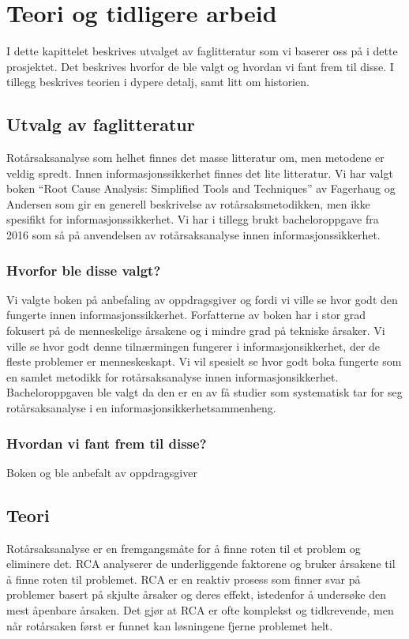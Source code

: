 \chapter{Teori og tidligere arbeid}
\label{kap:teori}
I dette kapittelet beskrives utvalget av faglitteratur som vi baserer oss på i dette prosjektet. Det beskrives hvorfor de ble valgt og hvordan vi fant frem til disse. I tillegg beskrives teorien i dypere detalj, samt litt om historien. 

\section{Utvalg av faglitteratur}
Rotårsaksanalyse som helhet finnes det masse litteratur om, men metodene er veldig spredt. Innen informasjonssikkerhet finnes det lite litteratur. Vi har valgt boken ``Root Cause Analysis: Simplified Tools and Techniques'' av Fagerhaug og Andersen \cite{RCA} som gir en generell beskrivelse av rotårsaksmetodikken, men ikke spesifikt for informasjonssikkerhet. Vi har i tillegg brukt bacheloroppgave fra 2016 \cite{RCARapport} som så på anvendelsen av rotårsaksanalyse innen informasjonssikkerhet.

\subsection{Hvorfor ble disse valgt?}
Vi valgte boken \cite{RCA} på anbefaling av oppdragsgiver og fordi vi ville se hvor godt den fungerte innen informasjonssikkerhet.  Forfatterne av boken \cite{RCA} har i stor grad fokusert på de menneskelige årsakene og i mindre grad på tekniske årsaker. Vi ville se hvor godt denne tilnærmingen fungerer i informasjonsikkerhet, der de fleste problemer er menneskeskapt. Vi vil spesielt se hvor godt boka fungerte som en samlet metodikk for rotårsaksanalyse innen informasjonsikkerhet. Bacheloroppgaven \cite{RCARapport} ble valgt da den er en av få studier som systematisk tar for seg rotårsaksanalyse i en informasjonsikkerhetsammenheng.    

\subsection{Hvordan vi fant frem til disse?}
Boken \cite{RCA} og  ble anbefalt av oppdragsgiver 

\section{Teori}
Rotårsaksanalyse er en fremgangsmåte for å finne roten til et problem og eliminere det. RCA analyserer de underliggende faktorene og bruker årsakene til å finne roten til problemet. RCA er en reaktiv prosess som finner svar på problemer basert på skjulte årsaker og deres effekt, istedenfor å undersøke den mest åpenbare årsaken. Det gjør at RCA er ofte komplekst og tidkrevende, men når rotårsaken først er funnet kan løsningene fjerne problemet helt. 

